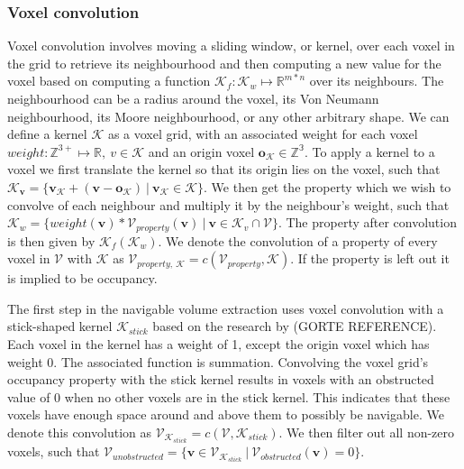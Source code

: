 \subsubsection{Voxel convolution}
Voxel convolution involves moving a sliding window, or kernel, over each voxel in the grid to retrieve its neighbourhood and then computing a new value for the voxel based on computing a function \(\mathcal{K}_f: \mathcal{K}_w \mapsto \mathbb{R}^{m*n}\) over its neighbours. The neighbourhood can be a radius around the voxel, its Von Neumann neighbourhood, its Moore neighbourhood, or any other arbitrary shape. We can define a kernel \(\mathcal{K}\) as a voxel grid, with an associated weight for each voxel \(weight: \mathbb{Z}^{3+} \mapsto \mathbb{R},\ v \in {\mathcal{K}}\) and an origin voxel \(\boldsymbol{o_{\mathcal{K}}} \in \mathbb{Z^{3}}\). To apply a kernel to a voxel we first translate the kernel so that its origin lies on the voxel, such that \(\mathcal{K}_{\boldsymbol{v}} = \{\boldsymbol{v_{\mathcal{K}}} + (\boldsymbol{v} - \boldsymbol{o_{\mathcal{K}}})\ |\ \boldsymbol{v_{\mathcal{K}}} \in \mathcal{K}\}\). We then get the property which we wish to convolve of each neighbour and multiply it by the neighbour's weight, such that \(\mathcal{K}_{w} = \{weight(\boldsymbol{v}) * \mathcal{V}_{property}(\boldsymbol{v})\ |\ \boldsymbol{v} \in \mathcal{K}_{v} \cap \mathcal{V}\}\). The property after convolution is then given by \(\mathcal{K}_f(\mathcal{K}_{w})\). We denote the convolution of a property of every voxel in \(\mathcal{V}\) with \(\mathcal{K}\) as \(\mathcal{V}_{property,\  \mathcal{K}} = c(\mathcal{V}_{property},\mathcal{K})\). If the property is left out it is implied to be occupancy.

The first step in the navigable volume extraction uses voxel convolution with a stick-shaped kernel \(\mathcal{K}_{stick}\) based on the research by (GORTE REFERENCE). Each voxel in the kernel has a weight of 1, except the origin voxel which has weight 0. The associated function is summation. Convolving the voxel grid's occupancy property with the stick kernel results in voxels with an obstructed value of 0 when no other voxels are in the stick kernel. This indicates that these voxels have enough space around and above them to possibly be navigable. We denote this convolution as \(\mathcal{V}_{\mathcal{K}_{stick}} = c(\mathcal{V},\mathcal{K}_{stick})\). We then filter out all non-zero voxels, such that \(\mathcal{V}_{unobstructed}=\{\boldsymbol{v} \in \mathcal{V}_{\mathcal{K}_{stick}}\ |\ \mathcal{V}_{obstructed}(\boldsymbol{v}) = 0\}\). 

